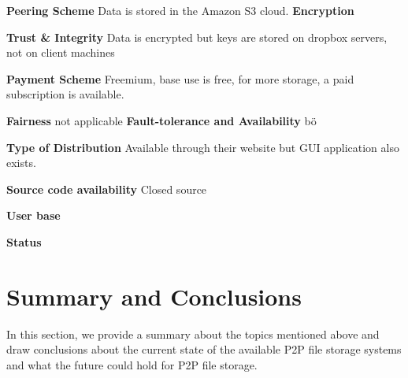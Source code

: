 \textbf{Peering Scheme}
Data is stored in the Amazon S3 cloud.
\textbf{Encryption}

\textbf{Trust \& Integrity}
Data is encrypted but keys are stored on dropbox servers, not on client machines

\textbf{Payment Scheme}
Freemium, base use is free, for more storage, a paid subscription is available.

\textbf{Fairness}
not applicable
\textbf{Fault-tolerance and Availability}
bö

\textbf{Type of Distribution}
Available through their website but GUI application also exists.

\textbf{Source code availability}
Closed source

\textbf{User base}

\textbf{Status}

\section{Summary and Conclusions} In this section, we provide a summary about the topics mentioned above and draw conclusions about the current state of the available P2P file storage systems and what the future could hold for P2P file storage.

